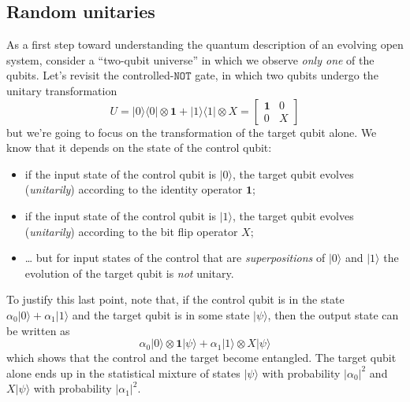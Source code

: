 \documentclass[fleqn]{article}
\providecommand{\tightlist}{%
  \setlength{\itemsep}{0pt}\setlength{\parskip}{0pt}}
\begin{document}
\hypertarget{random-unitaries}{%
\subsection{Random unitaries}\label{random-unitaries}}

As a first step toward understanding the quantum description of an evolving open system, consider a ``two-qubit universe'' in which we observe \emph{only one} of the qubits.
Let's revisit the controlled-\(\texttt{NOT}\) gate, in which two qubits undergo the unitary transformation
\[
  U
  = |0\rangle\langle 0|\otimes\mathbf{1}+|1\rangle\langle 1|\otimes X
  = \begin{bmatrix}\mathbf{1}&0\\0&X\end{bmatrix}
\]
but we're going to focus on the transformation of the target qubit alone.
We know that it depends on the state of the control qubit:

\begin{itemize}
\tightlist
\item
  if the input state of the control qubit is \(|0\rangle\), the target qubit evolves (\emph{unitarily}) according to the identity operator \(\mathbf{1}\);
\item
  if the input state of the control qubit is \(|1\rangle\), the target qubit evolves (\emph{unitarily}) according to the bit flip operator \(X\);
\item
  \ldots{} but for input states of the control that are \emph{superpositions} of \(|0\rangle\) and \(|1\rangle\) the evolution of the target qubit is \emph{not} unitary.
\end{itemize}

To justify this last point, note that, if the control qubit is in the state \(\alpha_0|0\rangle+\alpha_1|1\rangle\) and the target qubit is in some state \(|\psi\rangle\), then the output state can be written as
\[
  \alpha_0|0\rangle\otimes\mathbf{1}|\psi\rangle + \alpha_1|1\rangle\otimes X|\psi\rangle
\]
which shows that the control and the target become entangled.
The target qubit alone ends up in the statistical mixture of states \(|\psi\rangle\) with probability \(|\alpha_0|^2\) and \(X|\psi\rangle\) with probability \(|\alpha_1|^2\).
\end{document}
